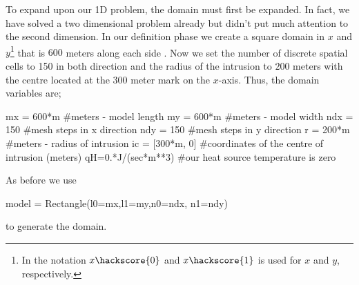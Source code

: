 To expand upon our 1D problem, the domain must first be expanded. In fact, we have solved a two dimensional problem already but didn't put much 
attention to the second dimension.
In our definition phase we create a square domain in $x$ and $y$\footnote{In \esc the notation
$x\hackscore{0}$ and $x\hackscore{1}$ is used for $x$ and $y$, respectively.} that is $600$ meters along each side . Now we set the number of discrete spatial cells to 150 in both direction and the radius of the intrusion to $200$ meters with the centre located at the $300$ meter mark on the $x$-axis. Thus, the domain variables are;
\begin{python}
mx = 600*m #meters - model length
my = 600*m #meters - model width
ndx = 150 #mesh steps in x direction 
ndy = 150 #mesh steps in y direction
r = 200*m #meters - radius of intrusion
ic = [300*m, 0] #coordinates of the centre of intrusion (meters)
qH=0.*J/(sec*m**3) #our heat source temperature is zero
\end{python}
As before we use 
\begin{python}
model = Rectangle(l0=mx,l1=my,n0=ndx, n1=ndy)
\end{python}
to generate the domain. 

